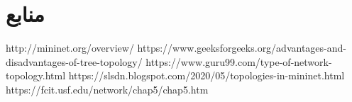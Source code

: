 \documentclass{article}
\begin{document}
\section*{منابع}
\renewcommand{\section}[2]{}%
\begin{thebibliography}{99} %


\begin{LTRitems}

\resetlatinfont

 http://mininet.org/overview/
 https://www.geeksforgeeks.org/advantages-and-disadvantages-of-tree-topology/
 https://www.guru99.com/type-of-network-topology.html
 https://slsdn.blogspot.com/2020/05/topologies-in-mininet.html
 https://fcit.usf.edu/network/chap5/chap5.htm
\end{LTRitems}

\end{thebibliography}
\end{document}
